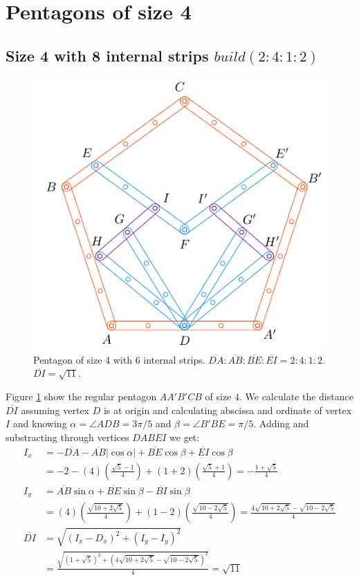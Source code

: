 \documentclass[11pt]{article}
\begin{document}

\section{Pentagons of size 4}

\subsection{Size 4 with 8 internal strips $build(2:4:1:2)$}

\begin{figure}[h]
\centering
\includegraphics[scale=1.1]{4/penta4-8a}
\caption{Pentagon of size 4 with 6 internal strips. $\overline{DA} : \overline{AB} : \overline{BE} : \overline{EI} = 2:4:1:2$. $\overline{DI} = \sqrt{11}$.}
\label{fig:penta4-8a}
\end{figure}

Figure \ref{fig:penta4-8a} show the regular pentagon $AA'B'CB$ of size $4$. We calculate the distance $\overline{DI}$ assuming vertex $D$ is at origin and calculating abscissa and ordinate of vertex $I$ and knowing $\alpha = \angle{ADB} = 3\pi / 5$ and $\beta = \angle{B'BE} = \pi / 5$. Adding and substracting through vertices $DABEI$ we get:
\begin{align}
I_x &= -\overline{DA} - \overline{AB}|\cos\alpha| + \overline{BE}\cos\beta + \overline{EI}\cos\beta \nonumber\\
 &= -2 -(4)\left(\frac{\sqrt5 - 1}4\right) + (1+2)\left(\frac{\sqrt5+1}4\right)
 = -\frac{1+\sqrt5}4 \\
I_y &= \overline{AB}\sin\alpha + \overline{BE}\sin\beta - \overline{BI}\sin\beta \nonumber\\
 &= (4)\left(\frac{\sqrt{10+2\sqrt5}}4\right) + (1-2)\left(\frac{\sqrt{10-2\sqrt5}}4\right)
 = \frac{4\sqrt{10+2\sqrt5} - \sqrt{10-2\sqrt5}}4 \\
%
\overline{DI} &= \sqrt{(I_x - D_x)^2 + (I_y - I_y)^2} \nonumber\\
 &= \frac{\sqrt{(1+\sqrt5)^2 + (4\sqrt{10+2\sqrt5} - \sqrt{10-2\sqrt5})^2}}4
 = \sqrt{11}
\end{align}
\end{document}
